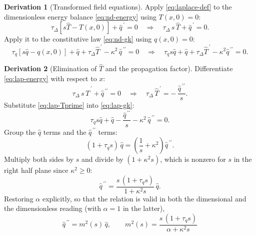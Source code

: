 \documentclass[11pt,a4paper]{article}
\theoremstyle{definition}
\newtheorem{derivationx}{Derivation}[section]
\newcommand{\tq}{\tau_{q}}
\newcommand{\kk}{\kappa^{2}}
\newcommand{\Lap}[1]{\hat{#1}}
\begin{document}
\begin{derivationx}[Transformed field equations]
\label{der:lap-fields}
Apply \eqref{eq:laplace-def} to the dimensionless energy balance
\eqref{eq:nd-energy} using $T(x,0)=0$:
\begin{equation}
  \tau_{\Delta}\left[s\Lap T - T(x,0)\right] + \Lap q^{\,\prime} = 0
  \quad\Longrightarrow\quad
  \tau_{\Delta}\,s\,\Lap T + \Lap q^{\,\prime} = 0 .
  \label{eq:lap-energy}
\end{equation}
Apply it to the constitutive law \eqref{eq:nd-gk} using $q(x,0)=0$:
\begin{equation}
  \tq\left[s\Lap q - q(x,0)\right] + \Lap q
    + \tau_{\Delta}\Lap T^{\,\prime} - \kk\,\Lap q^{\,\prime\prime} = 0
  \quad\Longrightarrow\quad
  \tq s\Lap q + \Lap q
    + \tau_{\Delta}\Lap T^{\,\prime} - \kk\Lap q^{\,\prime\prime} = 0 .
  \label{eq:lap-gk}
\end{equation}
\end{derivationx}

\begin{derivationx}[Elimination of $\Lap T$ and the propagation factor]
\label{der:m2}
Differentiate \eqref{eq:lap-energy} with respect to $x$:
\begin{equation}
  \tau_{\Delta}\,s\,\Lap T^{\,\prime} + \Lap q^{\,\prime\prime} = 0
  \quad\Longrightarrow\quad
  \tau_{\Delta}\,\Lap T^{\,\prime}
    = -\,\frac{\Lap q^{\,\prime\prime}}{s} .
  \label{eq:lap-Tprime}
\end{equation}
Substitute \eqref{eq:lap-Tprime} into \eqref{eq:lap-gk}:
\begin{equation}
  \tq s \Lap q + \Lap q
  - \frac{\Lap q^{\,\prime\prime}}{s}
  - \kk\,\Lap q^{\,\prime\prime} = 0 .
  \label{eq:lap-sub}
\end{equation}
Group the $\Lap q$ terms and the $\Lap q^{\,\prime\prime}$ terms:
\begin{equation}
  (1+\tq s)\,\Lap q
  = \left(\frac{1}{s} + \kk\right)\Lap q^{\,\prime\prime} .
  \label{eq:lap-group}
\end{equation}
Multiply both sides by $s$ and divide by $(1+\kk s)$, which is nonzero for
$s$ in the right half plane since $\kk\ge0$:
\begin{equation}
  \Lap q^{\,\prime\prime}
   = \frac{s\,(1+\tq s)}{1+\kk s}\,\Lap q .
  \label{eq:helmholtz-nd}
\end{equation}
Restoring $\alpha$ explicitly, so that the relation is valid in both the
dimensional and the dimensionless reading (with $\alpha=1$ in the latter),
\begin{equation}
  \boxed{\ \Lap q^{\,\prime\prime} = m^{2}(s)\,\Lap q ,
  \qquad
  m^{2}(s) = \frac{s\,(1+\tq s)}{\alpha + \kk s}\ }
  \label{eq:m2}
\end{equation}
\end{derivationx}
\end{document}
